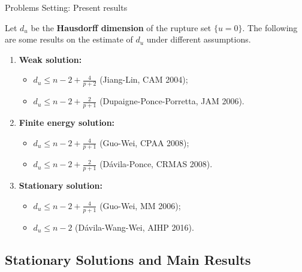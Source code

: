 \documentclass[11pt]{beamer}
\newcommand{\f}{\frac}
\theoremstyle{plain}
\theoremstyle{definition}
\begin{document}
\begin{frame}{Problems Setting: Present results}

Let $ d_u $ be the \textbf{Hausdorff dimension} of the rupture set $ \{u=0\} $. The following are some results on the estimate of $ d_u $ under different assumptions.\pause

\begin{enumerate}
\item\textbf{Weak solution:}
\begin{itemize}
\item $ d_u\leq n-2+\f{4}{p+2} $ (Jiang-Lin, CAM 2004);
\item $ d_u\leq n-2+\f{2}{p+1} $ (Dupaigne-Ponce-Porretta, JAM 2006).
\end{itemize}\pause
\item\textbf{Finite energy solution:}
\begin{itemize}
\item $ d_u\leq n-2+\f{4}{p+1} $ (Guo-Wei, CPAA 2008);
\item $ d_u\leq n-2+\f{2}{p+1} $ (D\'{a}vila-Ponce, CRMAS 2008).
\end{itemize}\pause
\item\textbf{Stationary solution:}
\begin{itemize}
\item $ d_u\leq n-2+\f{4}{p+1} $ (Guo-Wei, MM 2006);
\item $ d_u\leq n-2 $ (D\'{a}vila-Wang-Wei, AIHP 2016).
\end{itemize}
\end{enumerate}


\end{frame}

\subsection{Stationary Solutions and Main Results}
\end{document}
